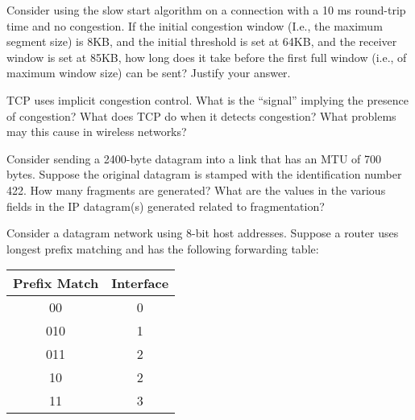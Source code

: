 \documentclass[answers,addpoints]{exam}
\begin{document}
\begin{questions}


\question
Consider using the slow start algorithm on a connection with a 10 ms round-trip time and no congestion. If the initial congestion window (I.e., the maximum segment size) is 8KB, and the initial threshold is set at 64KB, and the receiver window is set at 85KB, how long does it take before the first full window (i.e., of maximum window size) can be sent? Justify your answer. 
\fillwithdottedlines{1in}

\question
TCP uses implicit congestion control. What is the “signal” implying the presence of congestion? What does TCP do when it detects congestion? What problems may this cause in wireless networks?
\fillwithdottedlines{2in}

\question 
Consider sending a 2400-byte datagram into a link that has an MTU of 700 bytes. Suppose the original datagram is stamped with the identification number 422. How many fragments are generated? What are the values in the various fields in the IP datagram(s) generated related to fragmentation?
\vspace{3in}



\question 
Consider a datagram network using 8-bit host addresses. Suppose a router uses longest prefix matching and has the following forwarding table:
\begin{center}
 \begin{tabular}{|c | c|} 
 \hline
 Prefix Match & Interface \\ [0.5ex] 
 \hline
 00 & 0 \\ 
 \hline
 010 & 1 \\
 \hline
 011 & 2 \\
 \hline
 10 & 2 \\
 \hline
 11 & 3 \\ [1ex] 
 \hline
\end{tabular}
\end{center}


\end{questions}
\end{document}
